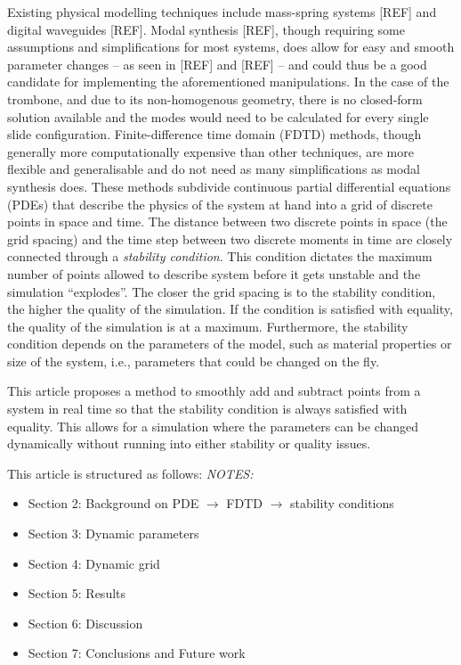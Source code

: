 \documentclass[dvipsnames, preprint]{JASA}
\def\SWcomment[#1]{\textcolor{Bittersweet}{#1}}
\begin{document}
Existing physical modelling techniques include mass-spring systems [REF] and digital waveguides [REF]. Modal synthesis [REF], though requiring some assumptions and simplifications for most systems, does allow for easy and smooth parameter changes -- as seen in [REF] and [REF] -- and could thus be a good candidate for implementing the aforementioned manipulations. \SWcomment[In the case of the trombone, and due to its non-homogenous geometry, there is no closed-form solution available and the modes would need to be calculated for every single slide configuration.] Finite-difference time domain (FDTD) methods, though generally more computationally expensive than other techniques, are more flexible and generalisable and do not need as many simplifications as modal synthesis does. These methods subdivide continuous partial differential equations (PDEs) that describe the physics of the system at hand into a grid of discrete points in space and time. 
%
%
The distance between two discrete points in space (the grid spacing) and the time step between two discrete moments in time are closely connected through a \textit{stability condition}. This condition dictates the maximum number of points allowed to describe system before it gets unstable and the simulation ``explodes''. The closer the grid spacing is to the stability condition, the higher the quality of the simulation. If the condition is satisfied with equality, the quality of the simulation is at a maximum. 
Furthermore, the stability condition depends on the parameters of the model, such as material properties or size of the system, i.e., parameters that could be changed on the fly.

This article proposes a method to smoothly add and subtract points from a system in real time so that the stability condition is always satisfied with equality. This allows for a simulation where the parameters can be changed dynamically without running into either stability or quality issues. 

This article is structured as follows: 
\textit{NOTES:}
\begin{itemize}
\item Section 2: Background on PDE $\rightarrow$ FDTD $\rightarrow$ stability conditions 
\item Section 3: Dynamic parameters
\item Section 4: Dynamic grid
\item Section 5: Results
\item Section 6: Discussion
\item Section 7: Conclusions and Future work
\end{itemize}
\end{document}
